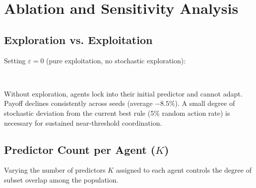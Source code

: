 \section{Ablation and Sensitivity Analysis}

\subsection{Exploration vs. Exploitation}

Setting $\varepsilon = 0$ (pure exploitation, no stochastic exploration): \\

\begin{table}[H]
\centering
\small
{} \\
\caption{Effect of exploration on mean payoff across 100 seeds}
\end{table}

Without exploration, agents lock into their initial predictor and cannot adapt. Payoff declines consistently across seeds (average $-8.5\%$). A small degree of stochastic deviation from the current best rule (5\% random action rate) is necessary for sustained near-threshold coordination. \\

\subsection{Predictor Count per Agent ($K$)}

Varying the number of predictors $K$ assigned to each agent controls the degree of subset overlap among the population. \\

\begin{table}[H]
\centering
\small
{} \\
\caption{Payoff and congestion across varying predictor count $K$}
\end{table}

